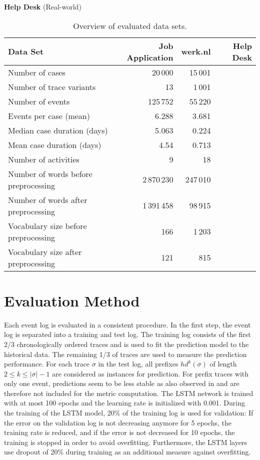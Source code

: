  
\textbf{Help Desk} (Real-world)

\begin{table}[!htbp]
	\begin{tabularx}{\textwidth}{l r r r}
		\toprule
		\textbf{Data Set} & \textbf{Job Application} & \textbf{werk.nl} &\textbf{Help Desk}  \\
		\midrule
		Number of cases & 20\,000& 15\,001& \\
		Number of trace variants &13 & 1\,001 & \\
		Number of events & 125\,752 & 55\,220 & \\
		Events per case (mean) & 6.288& 3.681& \\
		Median case duration (days) & 5.063 & 0.224& \\
		Mean case duration (days)&4.54 &  0.713 & \\
		Number of activities & 9 & 18 & \\
		Number of words before preprocessing & 2\,870\,230 &247\,010 & \\
		Number of words after preprocessing  &1\,391\,458 &98\,915 & \\
		Vocabulary size before preprocessing &166 & 1\,203 & \\
		Vocabulary size after preprocessing & 121 & 815 & \\
		\bottomrule
	\end{tabularx}
	\caption[Overview of evaluated data sets]{Overview of evaluated data sets.}
	\label{tab:logs}
\end{table}

\section{Evaluation Method}

Each event log is evaluated in a consistent procedure.
In the first step, the event log is separated into a training and test log. 
The training log consists of the first 2/3 chronologically ordered traces and is used to fit the prediction model to the historical data.
The remaining 1/3 of traces are used to measure the prediction performance.
For each trace $\sigma$ in the test log, all prefixes $hd^k(\sigma)$ of length $2 \leq k \leq |\sigma| - 1$ are considered as instances for prediction.
For prefix traces with only one event, predictions seem to be less stable as also observed in \cite{DBLP:conf/caise/TaxVRD17} and are therefore not included for the metric computation.
The LSTM network is trained with at most 100 epochs and the learning rate is initialized with 0.001.
During the training of the LSTM model, 20\% of the training log is used for validation: If the error on the validation log is not decreasing anymore for 5 epochs, the training rate is reduced, and if the error is not decreased for 10 epochs, the training is stopped in order to avoid overfitting.
Furthermore, the LSTM layers use dropout \cite{DBLP:journals/corr/abs-1207-0580} of 20\% during training as an additional measure against overfitting.

